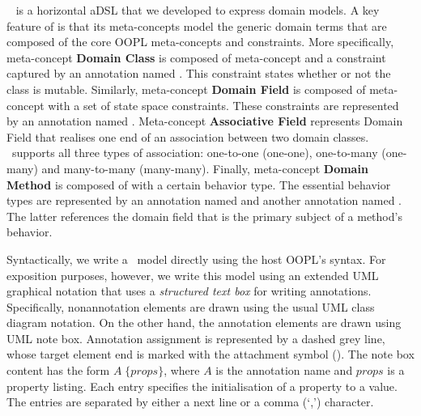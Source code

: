 
~\cite{le_domain_2018} is a horizontal aDSL that we developed to express domain models.
A key feature of  is that its meta-concepts model the generic domain terms that are composed of the core OOPL meta-concepts and constraints. More specifically, meta-concept \textbf{Domain Class} is composed of meta-concept  and a constraint captured by an annotation named . This constraint states whether or not the class is mutable. Similarly, meta-concept \textbf{Domain Field} is composed of meta-concept  with a set of state space constraints. 
These constraints are represented by an annotation named . 
Meta-concept \textbf{Associative Field} represents Domain Field that realises one end of an association between two domain classes. \dcsl~supports all three types of association: one-to-one (\abbr one-one), one-to-many (\abbr one-many) and many-to-many (\abbr many-many). 
Finally, meta-concept \textbf{Domain Method} is composed of  with a certain behavior type. The essential behavior types are represented by an annotation named  and another annotation named . The latter references the domain field that is the primary subject of a method's behavior.

Syntactically, we write a \dcsl~model directly using the host OOPL's syntax. For exposition purposes, however, we write this model using an extended UML graphical notation that uses a \textit{structured text box} for writing annotations. Specifically, nonannotation elements are drawn using the usual UML class diagram notation. On the other hand, the annotation elements are drawn using UML note box. Annotation assignment is represented by a dashed grey line, whose target element end is marked with the attachment symbol (\drawFilledRect[gray]{0.15cm}{0.15cm}). The note box content has the form $ A \; \{ props \} $, where $ A $ is the annotation name and $ props $ is a property listing. Each entry specifies the initialisation of a property to a value. 
The entries are separated by either a next line or a comma (`,') character.

